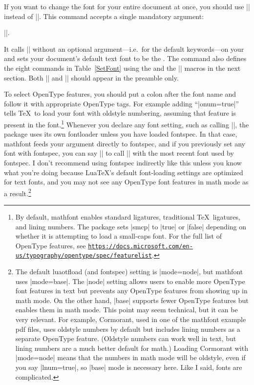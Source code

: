 \documentclass[12pt,twoside]{article}
\def\link#1{\href{#1}{\nolinkurl{#1}}}
\begin{document}
If you want to change the font for your entire document at once, you should use |\setfont| instead of |\mathfont|. This command accepts a single mandatory argument:
\begin{code}
||.
\end{code}
It calls |\mathfont| without an optional argument---i.e.\ for the default keywords---on your  and sets your document's default text font to be the . The command also defines the eight commands in Table~\ref{SetFont} using the  and the |\new| macros in the next section. Both |\mathfont| and |\setfont| should appear in the preamble only.

To select OpenType features, you should put a colon after the font name and follow it with appropriate OpenType tags. For example adding ``|onum=true|'' tells \TeX\ to load your font with oldstyle numbering, assuming that feature is present in the font.\footnote{By default, \textsf{mathfont} enables standard ligatures, traditional \TeX\ ligatures, and lining numbers. The package sets |smcp| to |true| or |false| depending on whether it is attempting to load a small-caps font. For the full list of OpenType features, see \link{https://docs.microsoft.com/en-us/typography/opentype/spec/featurelist}.} Whenever you declare any font setting, such as calling |\mathfont|, the package uses its own fontloader unless you have loaded \textsf{fontspec}. In that case, \textsf{mathfont} feeds your argument directly to \textsf{fontspec}, and if you previously set any font with \textsf{fontspec}, you can say || to call |\mathfont| with the most recent font used by \textsf{fontspec}. I don't recommend using \textsf{fontspec} indirectly like this unless you know what you're doing because Lua\TeX's default font-loading settings are optimized for text fonts, and you may not see any OpenType font features in math mode as a result.\footnote{The default \textsf{luaotfload} (and \textsf{fontspec}) setting is |mode=node|, but \textsf{mathfont} uses |mode=base|. The |node| setting allows users to enable more OpenType font features in text but prevents any OpenType features from showing up in math mode. On the other hand, |base| supports fewer OpenType features but enables them in math mode. This point may seem technical, but it can be very relevant. For example, Cormorant, used in one of the \textsf{mathfont} example pdf files, uses oldstyle numbers by default but includes lining numbers as a separate OpenType feature. (Oldstyle numbers can work well in text, but lining numbers are a much better default for math.) Loading Cormorant with |mode=node| means that the numbers in math mode will be oldstyle, even if you say |lnum=true|, so |base| mode is necessary here. Like I said, fonts are complicated.}
\end{document}
